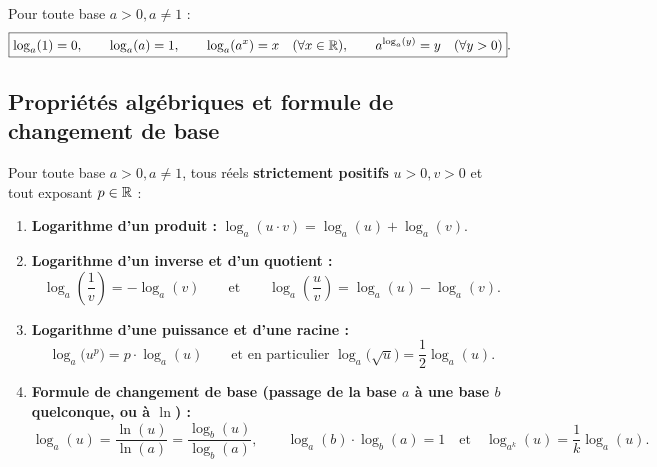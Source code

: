 \begin{theoreme}
Pour toute base $a > 0, a \neq 1$ :
\[
    \boxed{\log_a(1) = 0, \qquad \log_a(a) = 1, \qquad \log_a(a^x) = x \quad (\forall x \in \mathbb{R}), \qquad a^{\log_a(y)} = y \quad (\forall y > 0)}.
\]
\end{theoreme}

\subsection{Propriétés algébriques et formule de changement de base}

\begin{theoreme}
Pour toute base $a > 0, a \neq 1$, tous réels \textbf{strictement positifs} $u > 0, v > 0$ et tout exposant $p \in \mathbb{R}$ :
\begin{enumerate}
    \item \textbf{Logarithme d'un produit :} $\boxed{\log_a(u \cdot v) = \log_a(u) + \log_a(v)}$.
    \item \textbf{Logarithme d'un inverse et d'un quotient :}
    \[
        \boxed{\log_a\left(\frac{1}{v}\right) = -\log_a(v)} \qquad \text{et} \qquad \boxed{\log_a\left(\frac{u}{v}\right) = \log_a(u) - \log_a(v)}.
    \]
    \item \textbf{Logarithme d'une puissance et d'une racine :}
    \[
        \boxed{\log_a\bigl(u^p\bigr) = p \cdot \log_a(u)} \qquad \text{et en particulier } \log_a\bigl(\sqrt{u}\bigr) = \frac{1}{2}\log_a(u).
    \]
    \item \textbf{Formule de changement de base (passage de la base $a$ à une base $b$ quelconque, ou à $\ln$) :}
    \[
        \boxed{\log_a(u) = \frac{\ln(u)}{\ln(a)} = \frac{\log_b(u)}{\log_b(a)}}, \qquad \boxed{\log_a(b) \cdot \log_b(a) = 1} \quad \text{et} \quad \boxed{\log_{a^k}(u) = \frac{1}{k}\log_a(u)}.
    \]
\end{enumerate}
\end{theoreme}

